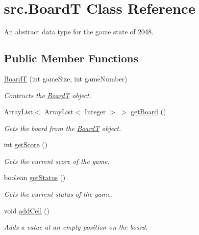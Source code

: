 \hypertarget{classsrc_1_1BoardT}{}\section{src.\+BoardT Class Reference}
\label{classsrc_1_1BoardT}


An abstract data type for the game state of 2048.  


\subsection*{Public Member Functions}
\begin{DoxyCompactItemize}
\item 
\hyperlink{classsrc_1_1BoardT_a9bf37b0ef9943d804da1647d251ea7ae}{BoardT} (int game\+Size, int game\+Number)
\begin{DoxyCompactList}\small\item\em Contructs the \hyperlink{classsrc_1_1BoardT}{BoardT} object. \end{DoxyCompactList}\item 
Array\+List$<$ Array\+List$<$ Integer $>$ $>$ \hyperlink{classsrc_1_1BoardT_a5ba0ca6da4a092e6f693379b09e4354c}{get\+Board} ()
\begin{DoxyCompactList}\small\item\em Gets the board from the \hyperlink{classsrc_1_1BoardT}{BoardT} object. \end{DoxyCompactList}\item 
int \hyperlink{classsrc_1_1BoardT_a540ee9b96f179d4f4a4be563b6d31566}{get\+Score} ()
\begin{DoxyCompactList}\small\item\em Gets the current score of the game. \end{DoxyCompactList}\item 
boolean \hyperlink{classsrc_1_1BoardT_a22b1a380928d8aff4d0026d73a421515}{get\+Status} ()
\begin{DoxyCompactList}\small\item\em Gets the current status of the game. \end{DoxyCompactList}\item 
\mbox{\label{classsrc_1_1BoardT_a8cd98f0126b2d00733cd57cc2101b928}} 
void \hyperlink{classsrc_1_1BoardT_a8cd98f0126b2d00733cd57cc2101b928}{add\+Cell} ()
\begin{DoxyCompactList}\small\item\em Adds a value at an empty position on the board. \end{DoxyCompactList}\item 

\end{DoxyCompactItemize}
